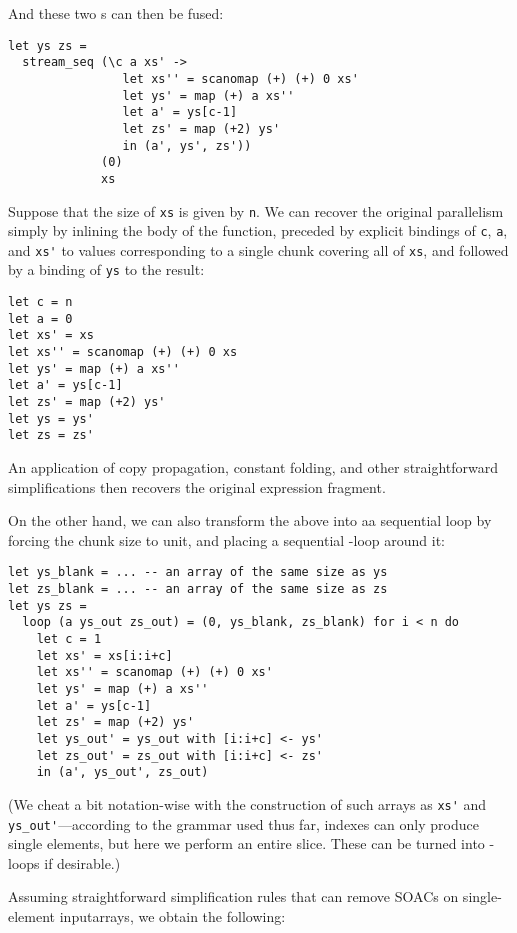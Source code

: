 And these two \StreamSeq{}s can then be fused:

\begin{lstlisting}
let ys zs =
  stream_seq (\c a xs' ->
                let xs'' = scanomap (+) (+) 0 xs'
                let ys' = map (+) a xs''
                let a' = ys[c-1]
                let zs' = map (+2) ys'
                in (a', ys', zs'))
             (0)
             xs
\end{lstlisting}

Suppose that the size of \lstinline{xs} is given by \lstinline{n}.  We
can recover the original parallelism simply by inlining the body of
the function, preceded by explicit bindings of \lstinline{c},
\lstinline{a}, and \lstinline{xs'} to values corresponding to a single
chunk covering all of \lstinline{xs}, and followed by a binding of
\lstinline{ys} to the result:

\begin{lstlisting}
let c = n
let a = 0
let xs' = xs
let xs'' = scanomap (+) (+) 0 xs
let ys' = map (+) a xs''
let a' = ys[c-1]
let zs' = map (+2) ys'
let ys = ys'
let zs = zs'
\end{lstlisting}

An application of copy propagation, constant folding, and other
straightforward simplifications then recovers the original expression
fragment.

On the other hand, we can also transform the above \StreamSeq into aa
sequential loop by forcing the chunk size to unit, and placing a
sequential -loop around it:

\begin{lstlisting}
let ys_blank = ... -- an array of the same size as ys
let zs_blank = ... -- an array of the same size as zs
let ys zs =
  loop (a ys_out zs_out) = (0, ys_blank, zs_blank) for i < n do
    let c = 1
    let xs' = xs[i:i+c]
    let xs'' = scanomap (+) (+) 0 xs'
    let ys' = map (+) a xs''
    let a' = ys[c-1]
    let zs' = map (+2) ys'
    let ys_out' = ys_out with [i:i+c] <- ys'
    let zs_out' = zs_out with [i:i+c] <- zs'
    in (a', ys_out', zs_out)
\end{lstlisting}

(We cheat a bit notation-wise with the construction of such arrays as
\lstinline{xs'} and \lstinline{ys_out'}---according to the grammar
used thus far, indexes can only produce single elements, but here we
perform an entire slice.  These can be turned into -loops if
desirable.)

Assuming straightforward simplification rules that can remove SOACs on
single-element inputarrays, we obtain the following:


